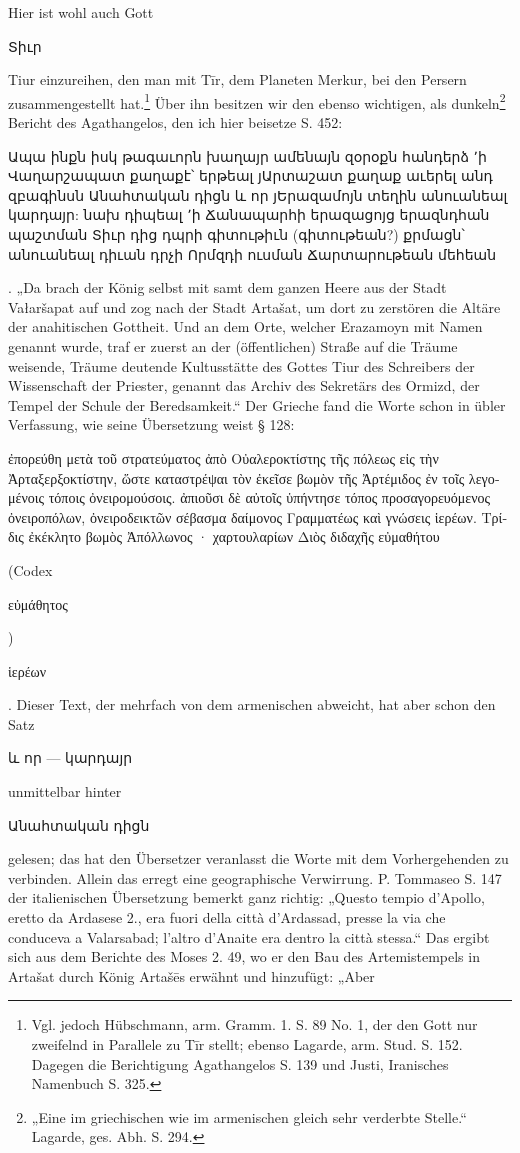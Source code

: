 \documentclass{article}
\begin{document}
Hier ist wohl auch Gott \begin{armenian}Տիւր\end{armenian} Tiur einzureihen, den man mit Tīr, dem Planeten Merkur, bei den Persern zusammengestellt hat.\footnote{Vgl. jedoch Hübschmann, arm. Gramm. 1. S. 89 No. 1, der den Gott nur zweifelnd in Parallele zu Tīr stellt; ebenso Lagarde, arm. Stud. S. 152. Dagegen die Berichtigung Agathangelos S. 139 und Justi, Iranisches Namenbuch S. 325.} Über ihn besitzen wir den ebenso wichtigen, als dunkeln\footnote{„Eine im griechischen wie im armenischen gleich sehr verderbte Stelle.“ Lagarde, ges. Abh. S. 294.} Bericht des Agathangelos, den ich hier beisetze S. 452: \begin{armenian}Ապա ինքն իսկ թագաւորն խաղայր ամենայն զօրօքն հանդերձ ՚ի Վաղարշապատ քաղաքէ՝ երթեալ յԱրտաշատ քաղաք աւերել անդ զբագինսն Անահտական դիցն և որ յԵրազամոյն տեղին անուանեալ կարդայր: նախ դիպեալ ՚ի Ճանապարհի երազացոյց երազնդհան պաշտման Տիւր դից դպրի գիտութիւն (գիտութեան?) քրմացն՝ անուանեալ դիւան դրչի Որմզդի ուսման Ճարտարութեան մեհեան\end{armenian}. „Da brach der König selbst mit samt dem ganzen Heere aus der Stadt Vałaršapat auf und zog nach der Stadt Artašat, um dort zu zerstören die Altäre der anahitischen Gottheit. Und an dem Orte, welcher Erazamoyn mit Namen genannt wurde, traf er zuerst an der (öffentlichen) Straße auf die Träume weisende, Träume deutende Kultusstätte des Gottes Tiur des Schreibers der Wissenschaft der Priester, genannt das Archiv des Sekretärs des Ormizd, der Tempel der Schule der Beredsamkeit.“ Der Grieche fand die Worte schon in übler Verfassung, wie seine Übersetzung weist § 128: \begin{greek}ἐπορεύθη μετὰ τοῦ στρατεύματος ἀπὸ Οὐαλεροκτίστης τῆς πόλεως εἰς τὴν Ἀρταξερξοκτίστην, ὥστε καταστρέψαι τὸν ἐκεῖσε βωμὸν τῆς Ἀρτέμιδος ἐν τοῖς λεγομένοις τόποις ὀνειρομούσοις. ἀπιοῦσι δὲ αὐτοῖς ὑπήντησε τόπος προσαγορευόμενος ὀνειροπόλων, ὀνειροδεικτῶν σέβασμα δαίμονος Γραμματέως καὶ γνώσεις ἱερέων. Τρίδις ἐκέκλητο βωμὸς Ἀπόλλωνος · χαρτουλαρίων Διὸς διδαχῆς εὐμαθήτου\end{greek} (Codex \begin{greek}εὐμάθητος\end{greek}) \begin{greek}ἱερέων\end{greek}. Dieser Text, der mehrfach von dem armenischen abweicht, hat aber schon den Satz \begin{armenian}և որ — կարդայր\end{armenian} unmittelbar hinter \begin{armenian}Անահտական դիցն\end{armenian} gelesen; das hat den Übersetzer veranlasst die Worte mit dem Vorhergehenden zu verbinden. Allein das erregt eine geographische Verwirrung. P. Tommaseo S. 147 der italienischen Übersetzung bemerkt ganz richtig: „Questo tempio d'Apollo, eretto da Ardasese 2., era fuori della città d'Ardassad, presse la via che conduceva a Valarsabad; l'altro d'Anaite era dentro la città stessa.“ Das ergibt sich aus dem Berichte des Moses 2. 49, wo er den Bau des Artemistempels in Artašat durch König Artašēs erwähnt und hinzufügt: „Aber 
\end{document}
